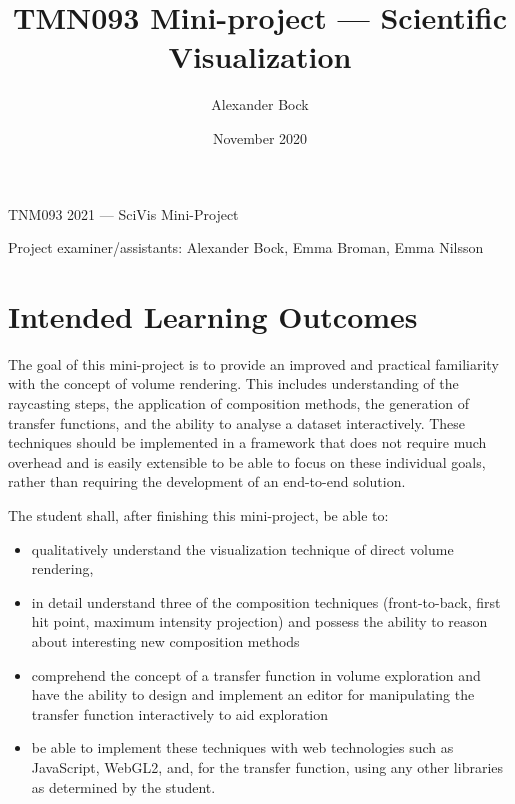 \documentclass{labinstructions}
\begin{document}
\setcounter{page}{1}

\pagestyle{empty}


%
%
\begin{center}
{\Huge TNM093 2021 --- SciVis Mini-Project}
\vspace{0.6cm}

\Large{Project examiner/assistants: Alexander Bock, Emma Broman, Emma Nilsson}
\end{center}

\title{TMN093 Mini-project --- Scientific Visualization}
\author{Alexander Bock}
\date{November 2020}

\pagestyle{fancy}
\fancyfoot[c]{}
\fancyfoot[R]{\thepage}

\section{Intended Learning Outcomes}
The goal of this mini-project is to provide an improved and practical familiarity with the concept of volume rendering.  This includes understanding of the raycasting steps, the application of composition methods, the generation of transfer functions, and the ability to analyse a dataset interactively.  These techniques should be implemented in a framework that does not require much overhead and is easily extensible to be able to focus on these individual goals, rather than requiring the development of an end-to-end solution.

The student shall, after finishing this mini-project, be able to:
\begin{itemize}
  \item qualitatively understand the visualization technique of direct volume rendering,
  \item in detail understand three of the composition techniques (front-to-back, first hit point, maximum intensity projection) and possess the ability to reason about interesting new composition methods
  \item comprehend the concept of a transfer function in volume exploration and have the ability to design and implement an editor for manipulating the transfer function interactively to aid exploration
  \item be able to implement these techniques with web technologies such as JavaScript, WebGL2, and, for the transfer function, using any other libraries as determined by the student.
\end{itemize}{}
\end{document}
